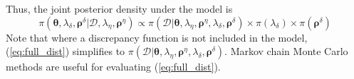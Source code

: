 \documentclass[12pt]{article}
\begin{document}
Thus, the joint posterior density under the model is
%
\begin{equation} \label{eq:full_dist}
\pi(\boldsymbol \theta,\lambda_\delta,\boldsymbol \rho^\delta|\mathcal D,\lambda_\eta,\boldsymbol \rho^\eta)
\propto \pi(\mathcal D | \boldsymbol \theta,\lambda_\eta, \boldsymbol \rho^\eta,\lambda_\delta,\boldsymbol \rho^\delta) \times %
\pi(\lambda_\delta) \times \pi(\boldsymbol \rho^\delta)
\end{equation}
%
Note that where a discrepancy function is not included in the model, 
(\ref{eq:full_dist}) simplifies to 
%
$\pi(\mathcal D | \boldsymbol \theta,\lambda_\eta, \boldsymbol \rho^\eta,\lambda_\delta,\boldsymbol \rho^\delta)$. 
%
Markov chain Monte Carlo methods are useful for evaluating (\ref{eq:full_dist}).

%
\end{document}
